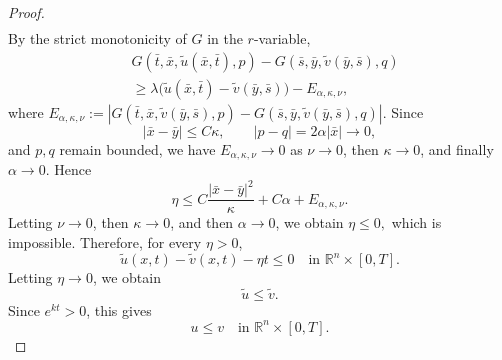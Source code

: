\documentclass[10pt,a4paper]{amsart}
\begin{document}
\begin{proof}
\[\begin{aligned}
\end{aligned}
\]
By the strict monotonicity of \(G\) in the \(r\)-variable,
\[
\begin{aligned}
 &G(\bar t,\bar x,\widetilde u(\bar x,\bar t),p)
 -
 G(\bar s,\bar y,\widetilde v(\bar y,\bar s),q)\\
 &\ge
 \lambda\bigl(\widetilde u(\bar x,\bar t)-\widetilde v(\bar y,\bar s)\bigr)
 -
 E_{\alpha,\kappa,\nu},
\end{aligned}
\]
where $ E_{\alpha,\kappa,\nu}
 :=
 \left|
 G(\bar t,\bar x,\widetilde v(\bar y,\bar s),p)
 -
 G(\bar s,\bar y,\widetilde v(\bar y,\bar s),q)
 \right|.$
Since
\[
 |\bar x-\bar y|\le C\kappa,
 \qquad
 |p-q|=2\alpha|\bar x|\to0,
\]
and \(p,q\) remain bounded, we have $E_{\alpha,\kappa,\nu}\to0$
as \(\nu\to0\), then \(\kappa\to0\), and finally \(\alpha\to0\). Hence
\[
 \eta
 \le
 C\frac{|\bar x-\bar y|^2}{\kappa}+C\alpha+E_{\alpha,\kappa,\nu}.
\]
Letting \(\nu\to0\), then \(\kappa\to0\), and then \(\alpha\to0\), we obtain $\eta\le0,$
which is impossible. Therefore, for every \(\eta>0\),
\[
 \widetilde u(x,t)-\widetilde v(x,t)-\eta t\le0
 \quad\text{in }\mathbb R^n\times[0,T].
\]
Letting \(\eta\to0\), we obtain
\[
 \widetilde u\le \widetilde v.
\]
Since \(e^{kt}>0\), this gives
\[
 u\le v
 \quad\text{in }\mathbb R^n\times[0,T].
\]
\end{proof}
\end{document}
